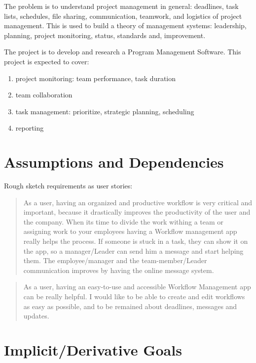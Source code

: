 \documentclass{article}[draft]
\begin{document}
The problem is to understand project management in general: deadlines, task lists, schedules, file sharing, communication, teamwork, and logistics of project management. This is used to build a theory of management systems: leadership, planning, project monitoring, status, standards and, improvement.

The project is to develop and research a Program Management Software. This project is expected to cover:
\begin{enumerate}
    \item project monitoring: team performance, task duration
    \item team collaboration
    \item task management: prioritize, strategic planning,  scheduling
    \item reporting
\end{enumerate}

\section{Assumptions and Dependencies}

Rough sketch requirements as user stories:
\begin{quotation}
    As a user, having an organized and productive workflow is very critical and important, because it drastically improves the productivity of the user and the company. When its time to divide the work withing a team or assigning work to your employees having a Workflow management app really helps the process. If someone is stuck in a task, they can show it on the app, so a manager/Leader can send him a message and start helping them. The employee/manager and the team-member/Leader communication improves by having the online message system.
\end{quotation}
\begin{quotation}
    As a user, having an easy-to-use and accessible Workflow Management app can be really helpful. I would like to be able to create and edit workflows as easy as possible, and to be remained about deadlines, messages and updates.
\end{quotation}

\section{Implicit/Derivative Goals}
\end{document}
